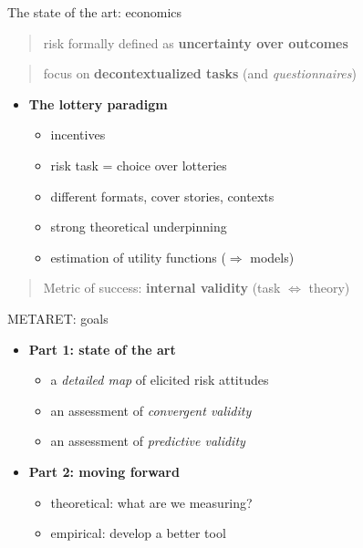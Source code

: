 \documentclass[
  ignorenonframetext,
]{beamer}
\providecommand{\tightlist}{%
  \setlength{\itemsep}{0pt}\setlength{\parskip}{0pt}}
\begin{document}
\begin{frame}{The state of the art: economics}
\protect\hypertarget{the-state-of-the-art-economics}{}

\begin{quote}
risk formally defined as \textbf{uncertainty over outcomes}
\end{quote}

\begin{quote}
focus on \textbf{decontextualized tasks} (and \emph{questionnaires})
\end{quote}

\begin{itemize}
\tightlist
\item
  \textbf{The lottery paradigm}

  \begin{itemize}
  \tightlist
  \item
    incentives
  \item
    risk task = choice over lotteries
  \item
    different formats, cover stories, contexts
  \item
    strong theoretical underpinning
  \item
    estimation of utility functions (\(\Rightarrow\) models)
  \end{itemize}
\end{itemize}

\begin{quote}
Metric of success: \textbf{internal validity} (task \(\iff\) theory)
\end{quote}

\end{frame}

\begin{frame}{METARET: goals}
\protect\hypertarget{metaret-goals}{}

\begin{itemize}
\tightlist
\item
  \textbf{Part 1: state of the art}

  \begin{itemize}
  \tightlist
  \item
    a \emph{detailed map} of elicited risk attitudes
  \item
    an assessment of \emph{convergent validity}
  \item
    an assessment of \emph{predictive validity}
  \end{itemize}
\item
  \textbf{Part 2: moving forward}

  \begin{itemize}
  \tightlist
  \item
    theoretical: what are we measuring?
  \item
    empirical: develop a better tool
  \end{itemize}
\end{itemize}

\end{frame}
\end{document}
